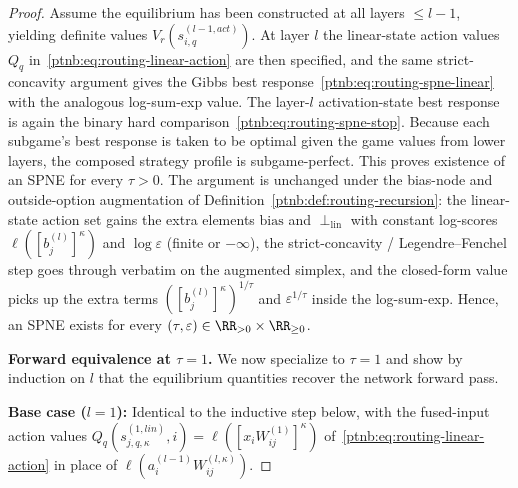 \begin{proof}
Assume the equilibrium has been constructed at all layers $\le l-1$, yielding definite values
$V_r(s_{i,q}^{(l-1,act)})$. At layer $l$ the linear-state action values $Q_q$
in~\eqref{ptnb:eq:routing-linear-action} are then specified, and the same strict-concavity argument
gives the Gibbs best response~\eqref{ptnb:eq:routing-spne-linear} with the analogous log-sum-exp value.
The layer-$l$ activation-state best response is again the binary hard
comparison~\eqref{ptnb:eq:routing-spne-stop}. Because each subgame's best response is taken to be
optimal given the game values from lower layers, the composed strategy profile is subgame-perfect.
This proves existence of an SPNE for every $\tau > 0$. The argument is unchanged under the
bias-node and outside-option augmentation of Definition~\ref{ptnb:def:routing-recursion}: the
linear-state action set gains the extra elements $\mathrm{bias}$ and $\perp_{\mathrm{lin}}$ with
constant log-scores $\ell([b_j^{(l)}]^\kappa)$ and $\log \varepsilon$ (finite or $-\infty$), the
strict-concavity / Legendre--Fenchel step goes through verbatim on the augmented simplex, and the
closed-form value picks up the extra terms $([b_j^{(l)}]^\kappa)^{1/\tau}$ and
$\varepsilon^{1/\tau}$ inside the log-sum-exp. Hence, an SPNE exists for every $(\tau, \varepsilon)
    \in \RR_{>0} \times \RR_{\ge 0}$.

\textbf{Forward equivalence at $\tau = 1$.} We now specialize to $\tau = 1$ and show by induction
on $l$ that the equilibrium quantities recover the network forward pass.

\textbf{Base case ($l=1$):} Identical to the inductive step below, with the fused-input action
values $Q_q(s_{j,q,\kappa}^{(1, lin)}, i) = \ell([x_iW_{ij}^{(1)}]^\kappa)$
of~\eqref{ptnb:eq:routing-linear-action} in place of $\ell(a_i^{(l-1)} W_{ij}^{(l,\kappa)})$.


\end{proof}
